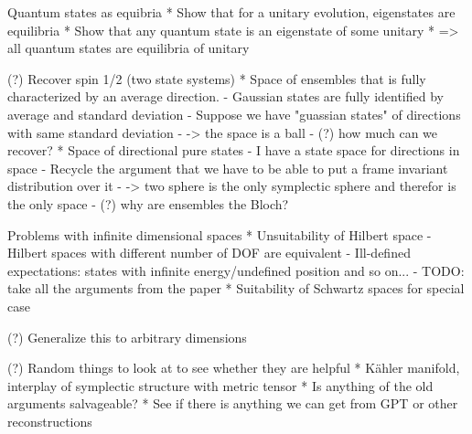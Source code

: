 Quantum states as equibria
* Show that for a unitary evolution, eigenstates are equilibria
* Show that any quantum state is an eigenstate of some unitary
* => all quantum states are equilibria of unitary

(?) Recover spin 1/2 (two state systems)
* Space of ensembles that is fully characterized by an average direction.
  - Gaussian states are fully identified by average and standard deviation
  - Suppose we have "guassian states" of directions with same standard deviation
  - -> the space is a ball
  - (?) how much can we recover?
* Space of directional pure states
  - I have a state space for directions in space
  - Recycle the argument that we have to be able to put a frame invariant distribution over it
  - -> two sphere is the only symplectic sphere and therefor is the only space
  - (?) why are ensembles the Bloch?
  
Problems with infinite dimensional spaces
* Unsuitability of Hilbert space
  - Hilbert spaces with different number of DOF are equivalent
  - Ill-defined expectations: states with infinite energy/undefined position and so on...
  - TODO: take all the arguments from the paper
* Suitability of Schwartz spaces for special case

(?) Generalize this to arbitrary dimensions

(?) Random things to look at to see whether they are helpful
* Kähler manifold, interplay of symplectic structure with metric tensor
* Is anything of the old arguments salvageable?
* See if there is anything we can get from GPT or other reconstructions



  
